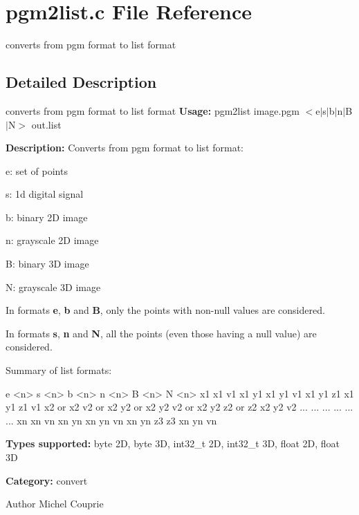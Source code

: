 \section{pgm2list.c File Reference}
\label{pgm2list_8c}


converts from pgm format to list format  




\subsection{Detailed Description}
converts from pgm format to list format {\bfseries Usage:} pgm2list image.pgm $<$e$|$s$|$b$|$n$|$B$|$N$>$ out.list

{\bfseries Description:} Converts from pgm format to list format: \begin{DoxyItemize}
\item e: set of points \item s: 1d digital signal \item b: binary 2D image \item n: grayscale 2D image \item B: binary 3D image \item N: grayscale 3D image\end{DoxyItemize}
In formats {\bfseries e}, {\bfseries b} and {\bfseries B}, only the points with non-\/null values are considered.

In formats {\bfseries s}, {\bfseries n} and {\bfseries N}, all the points (even those having a null value) are considered.

Summary of list formats: 
\begin{DoxyPre}  
  e <n>       s <n>         b <n>         n <n>            B <n>            N <n>    
  x1          x1 v1         x1 y1         x1 y1 v1         x1 y1 z1         x1 y1 z1 v1
  x2    or    x2 v2   or    x2 y2   or    x2 y2 v2   or    x2 y2 z2   or    z2 x2 y2 v2
  ...         ...           ...           ...              ...              ...
  xn          xn vn         xn yn         xn yn vn         xn yn z3         z3 xn yn vn
\end{DoxyPre}
 {\bfseries Types supported:} byte 2D, byte 3D, int32\_\-t 2D, int32\_\-t 3D, float 2D, float 3D

{\bfseries Category:} convert

\begin{DoxyAuthor}{Author}
Michel Couprie 
\end{DoxyAuthor}
